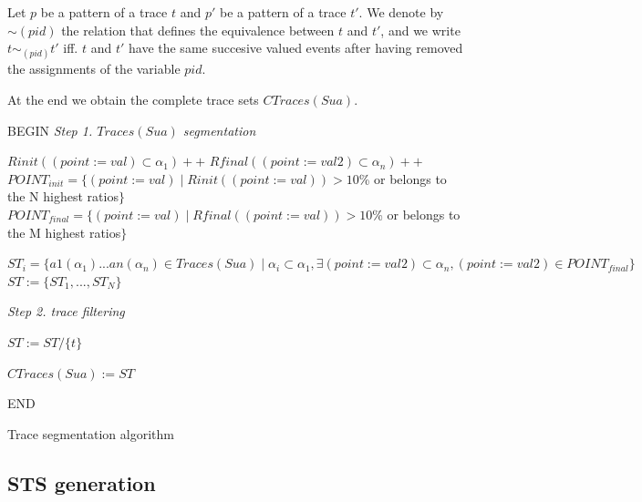 \begin{definition}
    Let $p$ be a pattern of a trace $t$ and $p'$ be a pattern of
    a trace $t'$. We denote by $\sim{(pid)}$ the relation that
    defines the equivalence between $t$ and $t'$, and we write
    $t \sim_{(pid)} t'$ iff. $t$ and $t'$ have the same succesive
    valued events after having removed the assignments of the
    variable $pid$.
\end{definition}

At the end we obtain the complete trace sets $CTraces(Sua)$.



\begin{algorithm}[h]


\BlankLine
BEGIN\;
\emph{Step 1. $Traces(Sua)$ segmentation}

 {
$Rinit((point:=val)\subset \alpha_1)++$\;
$Rfinal((point:=val2)\subset \alpha_n)++$\;
}
$POINT_{init}=\{(point:=val) \mid Rinit((point:=val))>10$\% or belongs to the N highest ratios$\}$\;
$POINT_{final}=\{(point:=val) \mid Rfinal((point:=val))>10$\% or belongs to the M highest ratios$\}$\;
\BlankLine

 {
	$ST_i=\{a1(\alpha_1)...an(\alpha_n)\in Traces(Sua) \mid \alpha_i\subset \alpha_1, \exists (point:=val2)\subset \alpha_n, (point:=val2)\in POINT_{final}    \}$\;
}
$ST:=\{ST_1,...,ST_N\}$\;

\BlankLine
\emph{Step 2. trace filtering}

 {
	{
		$ST:= ST/ \{  t \}$\;
	}


	}

    $CTraces(Sua) := ST$

END\;

\caption{Trace segmentation algorithm}
\label{algo_traces}
\end{algorithm}

\subsection{STS generation}
\label{sec:modelinf:prodsystems:generation}

